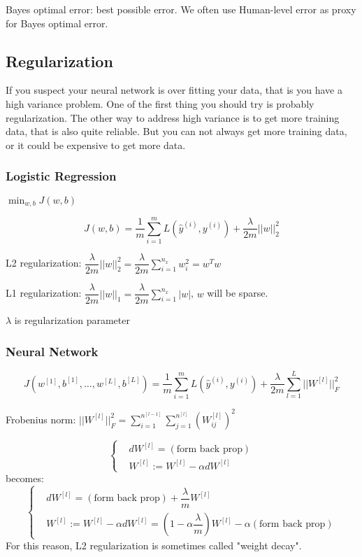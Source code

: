 Bayes optimal error: best possible error. We often use Human-level error as proxy for Bayes optimal error.

\subsection{Regularization}
If you suspect your neural network is over fitting your data, that is you have a high variance problem.
One of the first thing you should try is probably regularization.
The other way to address high variance is to get more training data, that is also quite reliable.
But you can not always get more training data, or it could be expensive to get more data.

\subsubsection{Logistic Regression}
$\min_{w, b} J(w, b)$

$$J(w, b) = \dfrac{1}{m} \sum_{i = 1}^m L(\hat{y}^{(i)}, y^{(i)}) + \dfrac{\lambda}{2m} ||w||_2^2$$

L2 regularization: $\dfrac{\lambda}{2m} ||w||_2^2 = \dfrac{\lambda}{2m} \sum_{i = 1}^{n_x} w_i^2 = w^T w$

L1 regularization: $\dfrac{\lambda}{2m} ||w||_1 = \dfrac{\lambda}{2m} \sum_{i = 1}^{n_x} |w|$, $w$ will be sparse.

$\lambda$ is regularization parameter

\subsubsection{Neural Network}
\begin{equation}
J(w^{[1]}, b^{[1]}, \ldots, w^{[L]}, b^{[L]}) = \dfrac{1}{m} \sum_{i = 1}^m L(\hat{y}^{(i)}, y^{(i)}) + \dfrac{\lambda}{2m} \sum_{l = 1}^L ||W^{[l]}||_F^2
\label{eq.regu.nn}
\end{equation}

Frobenius norm: $||W^{[l]}||_F^2 = \sum_{i = 1}^{n^{[l - 1]}} \sum_{j = 1}^{n^{[l]}} (W_{ij}^{[l]})^2$

$$
\left\{
\begin{aligned}
& dW^{[l]} = (\text{form back prop}) \\
& W^{[l]} := W^{[l]} - \alpha dW^{[l]}
\end{aligned}
\right.
$$
becomes:
$$
\left\{
\begin{aligned}
& dW^{[l]} = (\text{form back prop}) + \dfrac{\lambda}{m} W^{[l]} \\
& W^{[l]} := W^{[l]} - \alpha dW^{[l]} = (1 - \alpha \dfrac{\lambda}{m}) W^{[l]} - \alpha (\text{form back prop})
\end{aligned}
\right.
$$
For this reason, L2 regularization is sometimes called "weight decay".

